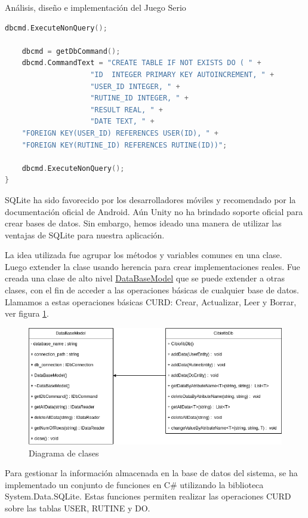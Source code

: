 \begin{thesischapter}{2} {Análisis, diseño e implementación del Juego Serio}
\begin{center}
\begin{minipage}{0.8\textwidth}
\begin{lstlisting}[language=c,caption={Sección de código, constructor de la clase CibiofibDb}, label={code: database-code}]
    dbcmd.ExecuteNonQuery();

    dbcmd = getDbCommand();
    dbcmd.CommandText = "CREATE TABLE IF NOT EXISTS DO ( " +
                    "ID  INTEGER PRIMARY KEY AUTOINCREMENT, " +
                    "USER_ID INTEGER, " +
                    "RUTINE_ID INTEGER, " +
                    "RESULT REAL, " +
                    "DATE TEXT, " +
    "FOREIGN KEY(USER_ID) REFERENCES USER(ID), " +
    "FOREIGN KEY(RUTINE_ID) REFERENCES RUTINE(ID))";

    dbcmd.ExecuteNonQuery();
}
\end{lstlisting}
\end{minipage}
\end{center}
    
\vspace{10pt}
SQLite ha sido favorecido por los desarrolladores móviles y recomendado por la documentación oficial de Android. Aún  
Unity no ha brindado soporte oficial para crear bases de datos. Sin embargo, hemos ideado una manera de utilizar las 
ventajas de SQLite para nuestra aplicación. 

\vspace{10pt}
La idea utilizada fue agrupar los métodos y variables comunes en una clase. Luego extender la clase usando herencia para 
crear implementaciones reales. Fue creada una clase de alto nivel \underline{DataBaseModel} que se puede extender a otras clases, con el 
fin de acceder a las operaciones básicas de cualquier base de datos. Llamamos a estas operaciones básicas CURD: Crear, 
Actualizar, Leer y Borrar, ver figura \ref{fig: diagram-db}.
\begin{figure}[ht]
    \centering
    \includegraphics[scale=0.5]{images/diagram-db.png}
    \caption{Diagrama de clases}
    \label{fig: diagram-db}
\end{figure}

Para gestionar la información almacenada en la base de datos del sistema, se ha implementado un conjunto de funciones en C\# utilizando la biblioteca 
System.Data.SQLite. Estas funciones permiten realizar las operaciones CURD sobre las tablas USER, RUTINE y DO.



\end{thesischapter}
